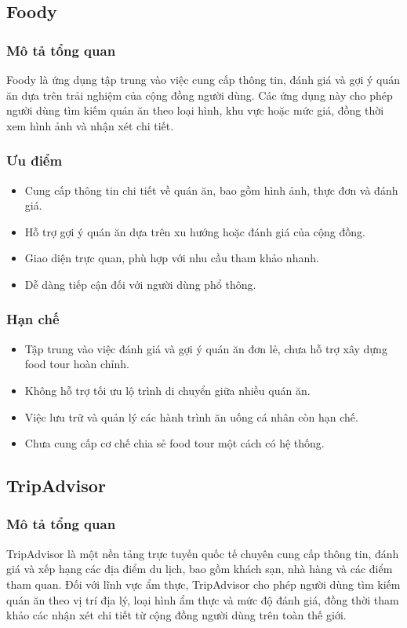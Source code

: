\subsection{Foody}
\subsubsection{Mô tả tổng quan}
Foody là ứng dụng tập trung vào việc cung cấp thông tin, đánh giá và gợi ý quán ăn dựa
trên trải nghiệm của cộng đồng người dùng. Các ứng dụng này cho phép người dùng tìm kiếm
quán ăn theo loại hình, khu vực hoặc mức giá, đồng thời xem hình ảnh và nhận xét chi tiết.
\subsubsection{Ưu điểm}
\begin{itemize}[label=\textbullet]
    \item Cung cấp thông tin chi tiết về quán ăn, bao gồm hình ảnh, thực đơn và đánh giá.
    \item Hỗ trợ gợi ý quán ăn dựa trên xu hướng hoặc đánh giá của cộng đồng.
    \item Giao diện trực quan, phù hợp với nhu cầu tham khảo nhanh.
    \item Dễ dàng tiếp cận đối với người dùng phổ thông.
\end{itemize}
\subsubsection{Hạn chế}
\begin{itemize}[label=\textbullet]
    \item Tập trung vào việc đánh giá và gợi ý quán ăn đơn lẻ, chưa hỗ trợ xây dựng food tour hoàn chỉnh.
    \item Không hỗ trợ tối ưu lộ trình di chuyển giữa nhiều quán ăn.
    \item Việc lưu trữ và quản lý các hành trình ăn uống cá nhân còn hạn chế.
    \item Chưa cung cấp cơ chế chia sẻ food tour một cách có hệ thống.
\end{itemize}

\subsection{TripAdvisor}

\subsubsection{Mô tả tổng quan}
TripAdvisor là một nền tảng trực tuyến quốc tế chuyên cung cấp thông tin, đánh giá và xếp hạng các địa điểm du lịch, bao gồm khách sạn, nhà hàng và các điểm tham quan.
Đối với lĩnh vực ẩm thực, TripAdvisor cho phép người dùng tìm kiếm quán ăn theo vị trí địa lý, loại hình ẩm thực và mức độ đánh giá, đồng thời tham khảo các nhận xét chi tiết từ cộng đồng người dùng trên toàn thế giới.

